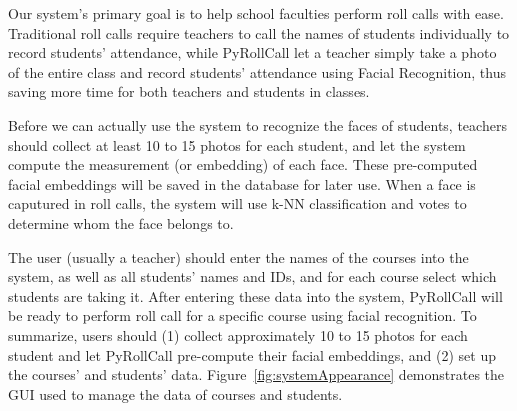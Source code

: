 Our system's primary goal is to help school faculties perform roll calls with ease.
Traditional roll calls require teachers to call the names of students individually to record students' attendance,
while PyRollCall let a teacher simply take a photo of the entire class and record students' attendance
using Facial Recognition, thus saving more time for both teachers and students in classes.
\vspace{0.5cm}

Before we can actually use the system to recognize the faces of students, teachers should
collect at least 10 to 15 photos for each student, and let the system compute the measurement (or embedding) of each face.
These pre-computed facial embeddings will be saved in the database for later use.
When a face is caputured in roll calls, the system will use k-NN classification and votes
to determine whom the face belongs to.
\vspace{0.5cm}

The user (usually a teacher) should enter the names of the courses into the system, as well as all students' names and IDs,
and for each course select which students are taking it. After entering these data into the system,
PyRollCall will be ready to perform roll call for a specific course using facial recognition.
To summarize, users should (1) collect approximately 10 to 15 photos for each student and
let PyRollCall pre-compute their facial embeddings, and (2) set up the courses' and students' data.
Figure~\ref{fig:systemAppearance} demonstrates the GUI used to manage the data of courses and students.
\vspace{0.8cm}

